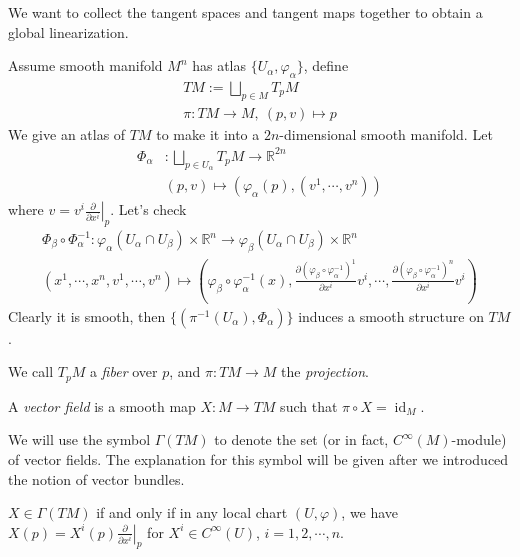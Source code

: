 We want to collect the tangent spaces and tangent maps together to obtain a global linearization.
\begin{defn}
    Assume smooth manifold $M^n$ has atlas $\{U_\alpha,\varphi_\alpha\}$, define
    \begin{gather*}
        TM:=\bigsqcup_{p\in M}T_pM\\
        \pi:TM\to M,\ (p,v)\mapsto p
    \end{gather*}
    We give an atlas of $TM$ to make it into a $2n$-dimensional smooth manifold.
    Let
    \begin{align*}
        \Phi_\alpha&:\bigsqcup_{p\in U_\alpha}T_pM\to\mathbb{R}^{2n}\\
        &(p,v)\mapsto(\varphi_\alpha(p),(v^1,\cdots,v^n))
    \end{align*}
    where $v=v^i\left.\frac{\partial{}}{\partial{x^i}}\right|_p$.
    Let's check
    \begin{gather*}
        \Phi_\beta\circ\Phi_\alpha^{-1}:\varphi_{\alpha}(U_\alpha\cap U_\beta)\times\mathbb{R}^n\to\varphi_\beta(U_\alpha\cap U_\beta)\times\mathbb{R}^n\\
        (x^1,\cdots,x^n,v^1,\cdots,v^n)\mapsto\left(\varphi_\beta\circ\varphi_\alpha^{-1}(x),\frac{\partial(\varphi_\beta\circ\varphi_\alpha^{-1})^1}{\partial{x^i}}v^i,\cdots,\frac{\partial(\varphi_\beta\circ\varphi_\alpha^{-1})^n}{\partial{x^i}}v^i\right)
    \end{gather*}
    Clearly it is smooth, then $\{(\pi^{-1}(U_\alpha),\Phi_\alpha)\}$ induces a smooth structure on $TM$.

    We call $T_pM$ a \emph{fiber} over $p$, and $\pi:TM\to M$ the \emph{projection}.
\end{defn}

\begin{defn}
    A \emph{vector field} is a smooth map $X:M\to TM$ such that $\pi\circ X=\operatorname{id}_M$.
\end{defn}

We will use the symbol $\Gamma(TM)$ to denote the set (or in fact, $C^\infty(M)$-module) of vector fields.
The explanation for this symbol will be given after we introduced the notion of vector bundles.

\begin{prop}
    $X\in\Gamma(TM)$ if and only if in any local chart $(U,\varphi)$, we have $X(p)=X^i(p)\left.\frac{\partial{}}{\partial{x^i}}\right|_p$ for $X^i\in C^\infty(U)$, $i=1,2,\cdots,n$.
\end{prop}

